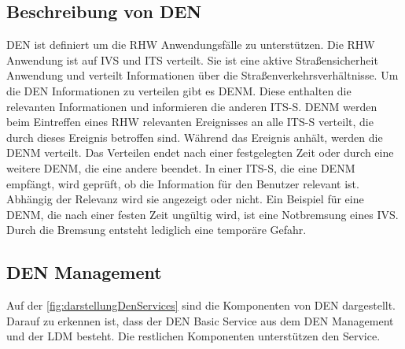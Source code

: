 \subsection{Beschreibung von DEN \label{facilityLayer_beschreibungDEN}}
\ac{DEN} ist definiert um die \ac{RHW} Anwendungsfälle zu unterstützen.	Die \ac{RHW} Anwendung ist auf \ac{IVS} und \ac{ITS} verteilt. Sie ist eine aktive Straßensicherheit Anwendung und verteilt Informationen über die Straßenverkehrsverhältnisse. Um die \ac{DEN} Informationen zu verteilen gibt es \ac{DENM}. Diese enthalten die relevanten Informationen und informieren die anderen \ac{ITS-S}. \ac{DENM} werden beim Eintreffen eines \ac{RHW} relevanten Ereignisses an alle \ac{ITS-S} verteilt, die durch dieses Ereignis betroffen sind. Während das Ereignis anhält, werden die \ac{DENM} verteilt. Das Verteilen endet nach einer festgelegten Zeit oder durch eine weitere \ac{DENM}, die eine andere beendet. In einer \ac{ITS-S}, die eine \ac{DENM} empfängt, wird geprüft, ob die Information für den Benutzer relevant ist. Abhängig der Relevanz wird sie angezeigt oder nicht. Ein Beispiel für eine \ac{DENM}, die nach einer festen Zeit ungültig wird, ist eine Notbremsung eines \ac{IVS}. Durch die Bremsung entsteht lediglich eine temporäre Gefahr. 


\subsection{DEN Management}
Auf der \autoref{fig:darstellungDenServices} sind die Komponenten von \ac{DEN} dargestellt. Darauf zu erkennen ist, dass der \ac{DEN} Basic Service aus dem \ac{DEN} Management und der \ac{LDM} besteht. Die restlichen Komponenten unterstützen den Service. 


